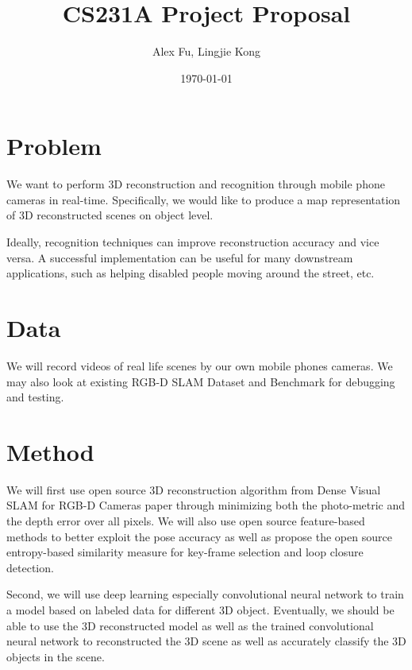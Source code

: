 \documentclass[dvips,12pt]{article}
\begin{document}
\title{CS231A Project Proposal}
\author{Alex Fu, Lingjie Kong}
\date{\today}

\maketitle

\section{Problem}

We want to perform 3D reconstruction and recognition through mobile phone cameras in real-time. Specifically, we would like to produce a map representation of 3D reconstructed scenes on object level.\par

Ideally, recognition techniques can improve reconstruction accuracy and vice versa. A successful implementation can be useful for many downstream applications, such as helping disabled people moving around the street, etc.


\section{Data}

We will record videos of real life scenes by our own mobile phones cameras. We may also look at existing RGB-D SLAM Dataset and Benchmark for debugging and testing.

\section{Method}

We will first use open source 3D reconstruction algorithm from Dense Visual SLAM for RGB-D Cameras paper through minimizing both the photo-metric and the depth error over all pixels. We will also use open source feature-based methods to better exploit the pose accuracy as well as propose the open source entropy-based similarity measure for key-frame selection and loop closure detection.\par

Second, we will use deep learning especially convolutional neural network to train a model based on labeled data for different 3D object. Eventually, we should be able to use the 3D reconstructed model as well as the trained convolutional neural network to reconstructed the 3D scene as well as accurately classify the 3D objects in the scene.\par
\end{document}
